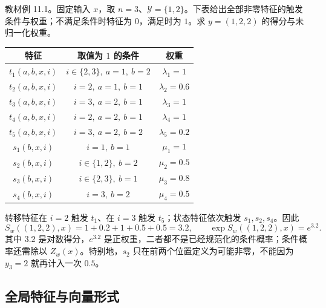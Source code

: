 \begin{example}
\label{ex:lihang-crf-feature-example}
教材例 11.1。固定输入 $x$，取 $n=3$、$\mathcal Y=\{1,2\}$。下表给出全部非零特征的触发条件与权重；不满足条件时特征为 $0$，满足时为 $1$。求 $y=(1,2,2)$ 的得分与未归一化权重。
\begin{center}
\begin{tabular}{ccc}
\toprule
特征 & 取值为 $1$ 的条件 & 权重\\
\midrule
$t_1(a,b,x,i)$ & $i\in\{2,3\},\ a=1,\ b=2$ & $\lambda_1=1$\\
$t_2(a,b,x,i)$ & $i=2,\ a=1,\ b=1$ & $\lambda_2=0.6$\\
$t_3(a,b,x,i)$ & $i=3,\ a=2,\ b=1$ & $\lambda_3=1$\\
$t_4(a,b,x,i)$ & $i=2,\ a=2,\ b=1$ & $\lambda_4=1$\\
$t_5(a,b,x,i)$ & $i=3,\ a=2,\ b=2$ & $\lambda_5=0.2$\\
$s_1(b,x,i)$ & $i=1,\ b=1$ & $\mu_1=1$\\
$s_2(b,x,i)$ & $i\in\{1,2\},\ b=2$ & $\mu_2=0.5$\\
$s_3(b,x,i)$ & $i\in\{2,3\},\ b=1$ & $\mu_3=0.8$\\
$s_4(b,x,i)$ & $i=3,\ b=2$ & $\mu_4=0.5$\\
\bottomrule
\end{tabular}
\end{center}
\end{example}
\begin{solve}
转移特征在 $i=2$ 触发 $t_1$、在 $i=3$ 触发 $t_5$；状态特征依次触发 $s_1,s_2,s_4$。因此
\[
  S_w((1,2,2),x)=1+0.2+1+0.5+0.5=3.2,
  \qquad \exp S_w((1,2,2),x)=e^{3.2}.
\]
其中 $3.2$ 是对数得分，$e^{3.2}$ 是正权重，二者都不是已经规范化的条件概率；条件概率还需除以 $Z_w(x)$。特别地，$s_2$ 只在前两个位置定义为可能非零，不能因为 $y_3=2$ 就再计入一次 $0.5$。
\end{solve}

\subsection{全局特征与向量形式}
\label{subsec:lihang-crf-global-features}

